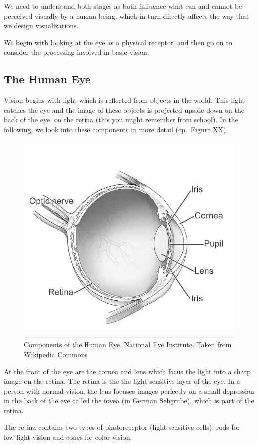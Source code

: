 \documentclass[
]{book}
\begin{document}
We need to understand both stages as both influence what can and cannot be perceived visually by a human being, which in turn directly affects the way that we design visualizations.

We begin with looking at the eye as a physical receptor, and then go on to consider the processing involved in basic vision.

\hypertarget{the-human-eye}{%
\subsection{The Human Eye}\label{the-human-eye}}

Vision begins with light which is reflected from objects in the world. This light catches the eye and the image of these objects is projected upside down on the back of the eye, on the retina (this you might remember from school). In the following, we look into these components in more detail (cp.~Figure XX).

\begin{figure}

{\centering \includegraphics[width=0.5\linewidth]{images/humaneye} 

}

\caption{Components of the Human Eye, National Eye Institute. Taken from Wikipedia Commons}\label{fig:unnamed-chunk-8}
\end{figure}

At the front of the eye are the cornea and lens which focus the light into a sharp image on the retina. The retina is the the light-sensitive layer of the eye. In a person with normal vision, the lens focuses images perfectly on a small depression in the back of the eye called the fovea (in German Sehgrube), which is part of the retina.

The retina contains two types of photoreceptor (light-sensitive cells): rods for low-light vision and cones for color vision.
\end{document}
